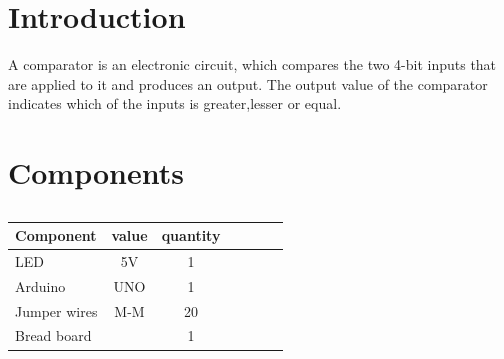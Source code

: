 \documentclass[10pt, a4paper]{article}
\title{\mytitle}
\author{\myauthor\hspace{1em}\\\contact\\IITH\hspace{0.5em}-\hspace{0.5em}\mymodule}
\date{}
\begin{document}
	\maketitle
	\tableofcontents
	\begin{abstract}
Design a sequential circuit that take(A3,A2,A1,A0) and (B3,B2,B1,B0) compares both A and B.The o/p should  be either one of the (A<B),(A>B),(A=B) and it will be displayed by LED's.

	\end{abstract}
    \section{Introduction}
    A comparator is an electronic circuit, which compares the two 4-bit inputs that are applied to it and produces an output. The output value of the comparator indicates which of the inputs is greater,lesser or equal.
	\section{Components}
	
\begin{table}[htbp]
 \begin{center}
    \begin{tabular}{|l|c|c|c|c|c|c} \hline \textbf{Component}
  & \textbf{value} & \textbf{quantity} \\
 \hline
LED & 5V & 1 \\ \hline
Arduino & UNO & 1 \\ \hline
Jumper wires & M-M & 20\\ \hline

Bread board &  & 1 \\ \hline
\end{tabular}   
\end{center}
\caption{\label{table:table} }
\end{table}
\end{document}
